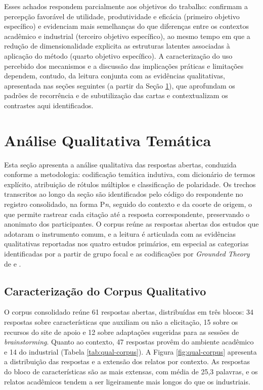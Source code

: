 Esses achados respondem parcialmente aos objetivos do trabalho: confirmam a percepção favorável de utilidade, produtividade e eficácia (primeiro objetivo específico) e evidenciam mais semelhanças do que diferenças entre os contextos acadêmico e industrial (terceiro objetivo específico), ao mesmo tempo em que a redução de dimensionalidade explicita as estruturas latentes associadas à aplicação do método (quarto objetivo específico). A caracterização do uso percebido dos mecanismos e a discussão das implicações práticas e limitações dependem, contudo, da leitura conjunta com as evidências qualitativas, apresentada nas seções seguintes (a partir da Seção \ref{sec:res-qualitativa}), que aprofundam os padrões de recorrência e de subutilização das cartas e contextualizam os contrastes aqui identificados.

\section{Análise Qualitativa Temática}
\label{sec:res-qualitativa}

Esta seção apresenta a análise qualitativa das respostas abertas, conduzida conforme a metodologia: codificação temática indutiva, com dicionário de termos explícito, atribuição de rótulos múltiplos e classificação de polaridade. Os trechos transcritos ao longo da seção são identificados pelo código do respondente no registro consolidado, na forma P\textit{n}, seguido do contexto e da coorte de origem, o que permite rastrear cada citação até a resposta correspondente, preservando o anonimato dos participantes. O corpus reúne as respostas abertas dos estudos que adotaram o instrumento comum, e a leitura é articulada com as evidências qualitativas reportadas nos quatro estudos primários, em especial as categorias identificadas por  a partir de grupo focal e as codificações por \textit{Grounded Theory} de  e .

\subsection{Caracterização do Corpus Qualitativo}
\label{sec:res-qual-corpus}

O corpus consolidado reúne 61 respostas abertas, distribuídas em três blocos: 34 respostas sobre características que auxiliam ou não a elicitação, 15 sobre os recursos do site de apoio e 12 sobre adaptações sugeridas para as sessões de \textit{brainstorming}. Quanto ao contexto, 47 respostas provêm do ambiente acadêmico e 14 do industrial (Tabela \ref{tab:qual-corpus}). A Figura \ref{fig:qual-corpus} apresenta a distribuição das respostas e a extensão dos relatos por contexto. As respostas do bloco de características são as mais extensas, com média de 25,3 palavras, e os relatos acadêmicos tendem a ser ligeiramente mais longos do que os industriais.

